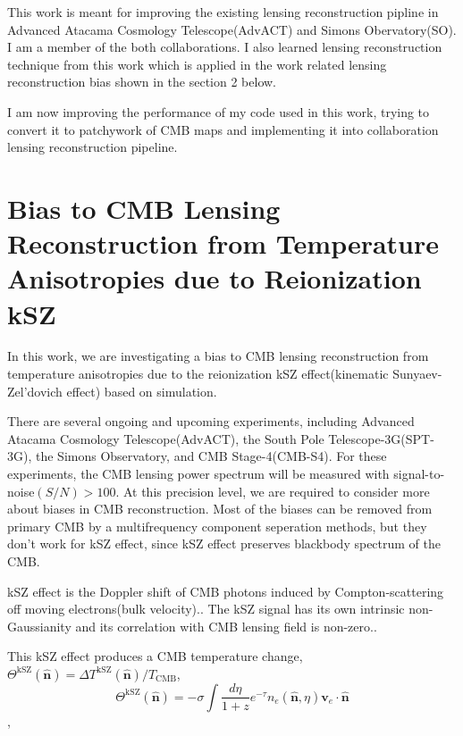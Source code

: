 \documentclass[12pt, notitlepage, onecolumn, amsmath, amssymb, aps]{revtex4-1}
\begin{document}
This work is meant for improving the existing lensing reconstruction pipline in Advanced Atacama Cosmology Telescope(AdvACT) and Simons Obervatory(SO). I am a member of the both collaborations. I also learned lensing reconstruction technique from this work which is applied in the work related lensing reconstruction bias shown in the section 2 below.

I am now improving the performance of my code used in this work, trying to convert it to patchywork of CMB maps and implementing it into collaboration lensing reconstruction pipeline.



\section{Bias to CMB Lensing Reconstruction from Temperature Anisotropies due to Reionization kSZ}
\label{sec:org093d799}
In this work, we are investigating a bias to CMB lensing reconstruction from temperature anisotropies due to the reionization kSZ effect(kinematic Sunyaev-Zel'dovich effect) based on simulation.

There are several ongoing and upcoming experiments, including Advanced Atacama Cosmology Telescope(AdvACT)\cite{Henderson:2015nzj}, the South Pole Telescope-3G(SPT-3G)\cite{Benson:2014qhw}, the Simons Observatory\cite{Ade:2018sbj}, and CMB Stage-4(CMB-S4)\cite{Abazajian:2016yjj}. For these experiments, the CMB lensing power spectrum will be measured with signal-to-noise\((S/N)>100\). At this precision level, we are required to consider more about biases in CMB reconstruction. Most of the biases can be removed from primary CMB by a multifrequency component seperation methods, but they don't work for kSZ effect, since kSZ effect preserves blackbody spectrum of the CMB.\cite{Smith:2009pn}

kSZ effect is the Doppler shift of CMB photons induced by Compton-scattering off moving electrons(bulk velocity).\cite{Ferraro:2017fac}. The kSZ signal has its own intrinsic non-Gaussianity and its correlation with CMB lensing field is non-zero.\cite{Smith:2016lnt}.

This kSZ effect produces a CMB temperature change, \(\Theta^{\mathrm{kSZ}}(\hat{\mathbf{n}})=\Delta T^{\mathrm{kSZ}}(\hat{\mathbf{n}}) / T_{\mathrm{CMB}}\),
\begin{equation}
  \Theta^{\mathrm{kSZ}}(\hat{\mathbf{n}})=-\sigma \int \frac{d \eta}{1+z} e^{-\tau} n_{e}(\hat{\mathbf{n}}, \eta) \mathbf{v}_{e} \cdot \hat{\mathbf{n}}
\end{equation} \cite{Ferraro:2017fac},
\end{document}
